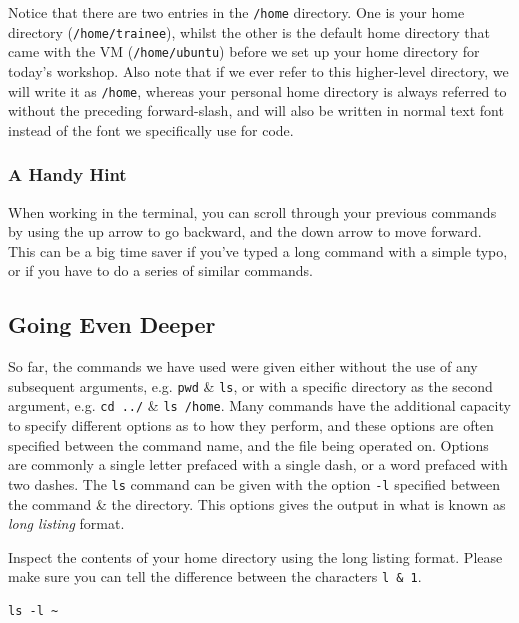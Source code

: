 \begin{note}
Notice that there are two entries in the \texttt{/home} directory. 
One is your home directory (\texttt{/home/trainee}), whilst the other is the default home directory that came with the VM (\texttt{/home/ubuntu}) before we set up your home directory for today's workshop.
Also note that if we ever refer to this higher-level directory, we will write it as \texttt{/home}, whereas your personal home directory is always referred to without the preceding forward-slash, and will also be written in normal text font instead of the font we specifically use for code. \\
\end{note}

\subsubsection*{A Handy Hint}
\begin{information}
When working in the terminal, you can scroll through your previous commands by using the up arrow to go backward, and the down arrow to move forward.
This can be a big time saver if you've typed a long command with a simple typo, or if you have to do a series of similar commands.
\end{information}

\subsection{Going Even Deeper}
\begin{information}
So far, the commands we have used were given either without the use of any subsequent arguments, e.g. \texttt{pwd} \& \texttt{ls}, or with a specific directory as the second argument, e.g. \texttt{cd ../} \& \texttt{ls /home}.
Many commands have the additional capacity to specify different options as to how they perform, and these options are often specified between the command name, and the file being operated on.
Options are commonly a single letter prefaced with a single dash, or a word prefaced with two dashes.
The \texttt{ls} command can be given with the option \texttt{-l} specified between the command \& the directory.
This options gives the output in what is known as \textit{long listing} format. \\
\end{information}

\begin{steps}
Inspect the contents of your home directory using the long listing format. 
Please make sure you can tell the difference between the characters \texttt{l \& 1}.\\
\begin{lstlisting}
ls -l ~
\end{lstlisting}
\end{steps}

